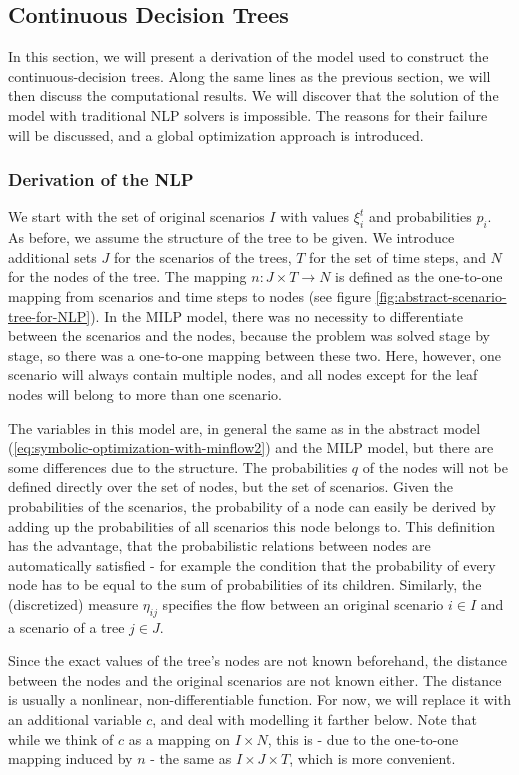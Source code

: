 \subsection{Continuous Decision Trees}
In this  section, we will present a derivation of the model used to construct the continuous-decision trees.
Along the same lines as the previous section, we will then discuss the computational results.
We will discover that the solution of the model with traditional NLP solvers is impossible.
The reasons for their failure will be discussed, and a global optimization approach is introduced.
\subsubsection{Derivation of the NLP}
We start with the set of original scenarios $I$ with values $\xi_i^t$ and probabilities $p_i$. As before, we assume the structure of the tree to be given. We introduce additional sets $J$ for the scenarios of the trees, $T$ for the set of time steps, and $N$ for the nodes of the tree. The mapping $n:J\times T\rightarrow N$ is defined as the one-to-one mapping from scenarios and time steps to nodes (see figure \ref{fig:abstract-scenario-tree-for-NLP}). In the MILP model, there was no necessity to differentiate between the scenarios and the nodes, because the problem was solved stage by stage, so there was a one-to-one mapping between these two. Here, however, one scenario will always contain multiple nodes, and all nodes except for the leaf nodes will belong to more than one scenario.

The variables in this model are, in general the same as in the abstract model (\ref{eq:symbolic-optimization-with-minflow2}) and the MILP model, but there are some differences due to the structure. The probabilities $q$ of the nodes will not be defined directly over the set of nodes, but the set of scenarios. Given the probabilities of the scenarios, the probability of a node can easily be derived by adding up the probabilities of all scenarios this node belongs to. This definition has the advantage, that the probabilistic relations between nodes are automatically satisfied - for example the condition that the probability of every node has to be equal to the sum of probabilities of its children.  Similarly, the (discretized) measure $\eta_{ij}$ specifies the flow between an original scenario $i \in I$ and a scenario of a tree $j \in J$.

Since the exact values of the tree's nodes are not known beforehand, the distance between the nodes and the original scenarios are not known either. The distance is usually a nonlinear, non-differentiable function. For now, we will replace it with an additional variable $c$, and deal with modelling it farther below. Note that while we think of $c$ as a mapping on $I\times N$, this is - due to the one-to-one mapping induced by $n$ - the same as $I\times J\times T$, which is more convenient.

